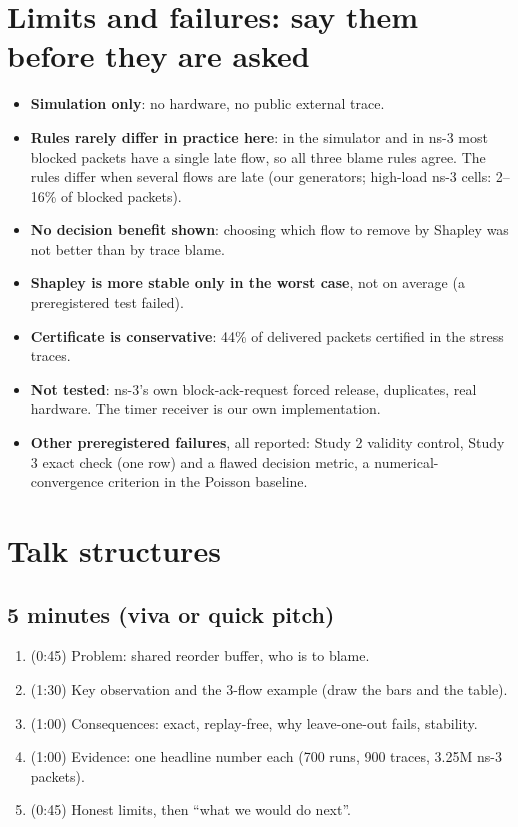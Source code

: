 \documentclass[11pt]{article}
\begin{document}
\section{Limits and failures: say them before they are asked}
\begin{itemize}
\item \textbf{Simulation only}: no hardware, no public external trace.
\item \textbf{Rules rarely differ in practice here}: in the simulator and in ns-3 most blocked packets have a single late flow, so all three blame rules agree. The rules differ when several flows are late (our generators; high-load ns-3 cells: 2--16\% of blocked packets).
\item \textbf{No decision benefit shown}: choosing which flow to remove by Shapley was not better than by trace blame.
\item \textbf{Shapley is more stable only in the worst case}, not on average (a preregistered test failed).
\item \textbf{Certificate is conservative}: 44\% of delivered packets certified in the stress traces.
\item \textbf{Not tested}: ns-3's own block-ack-request forced release, duplicates, real hardware. The timer receiver is our own implementation.
\item \textbf{Other preregistered failures}, all reported: Study 2 validity control, Study 3 exact check (one row) and a flawed decision metric, a numerical-convergence criterion in the Poisson baseline.
\end{itemize}

\section{Talk structures}
\subsection*{5 minutes (viva or quick pitch)}
\begin{enumerate}
\item (0:45) Problem: shared reorder buffer, who is to blame.
\item (1:30) Key observation and the 3-flow example (draw the bars and the table).
\item (1:00) Consequences: exact, replay-free, why leave-one-out fails, stability.
\item (1:00) Evidence: one headline number each (700 runs, 900 traces, 3.25M ns-3 packets).
\item (0:45) Honest limits, then ``what we would do next''.
\end{enumerate}
\end{document}
